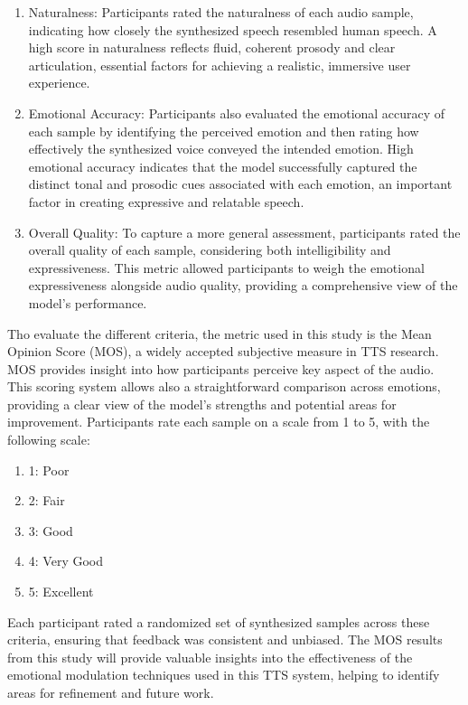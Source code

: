 \begin{enumerate}
\item Naturalness: Participants rated the naturalness of each audio sample, indicating how closely the synthesized speech resembled human speech. A high score in naturalness reflects fluid, coherent prosody and clear articulation, essential factors for achieving a realistic, immersive user experience.

\item Emotional Accuracy: Participants also evaluated the emotional accuracy of each sample by identifying the perceived emotion and then rating how effectively the synthesized voice conveyed the intended emotion. High emotional accuracy indicates that the model successfully captured the distinct tonal and prosodic cues associated with each emotion, an important factor in creating expressive and relatable speech.

\item Overall Quality: To capture a more general assessment, participants rated the overall quality of each sample, considering both intelligibility and expressiveness. This metric allowed participants to weigh the emotional expressiveness alongside audio quality, providing a comprehensive view of the model’s performance.
\end{enumerate}

Tho evaluate the different criteria, the metric used in this study is the Mean Opinion Score (MOS), a widely accepted subjective measure in TTS research. MOS provides insight into how participants perceive key aspect of the audio. This scoring system allows also a straightforward comparison across emotions, providing a clear view of the model’s strengths and potential areas for improvement. Participants rate each sample on a scale from 1 to 5, with the following scale:

\begin{enumerate}
\item 1: Poor
\item 2: Fair
\item 3: Good
\item 4: Very Good
\item 5: Excellent
\end{enumerate}

Each participant rated a randomized set of synthesized samples across these criteria, ensuring that feedback was consistent and unbiased. The MOS results from this study will provide valuable insights into the effectiveness of the emotional modulation techniques used in this TTS system, helping to identify areas for refinement and future work.

